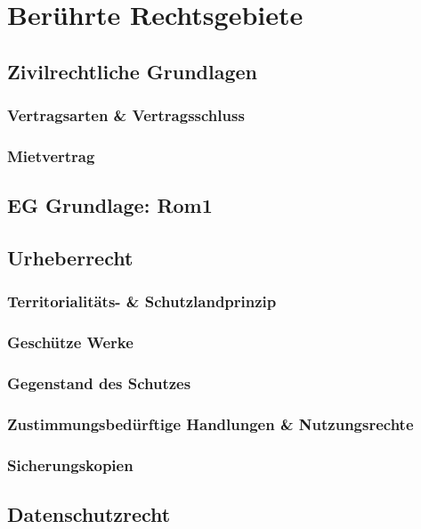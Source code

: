 \chapter{Ber\"uhrte Rechtsgebiete}
\section{Zivilrechtliche Grundlagen}
\subsection{Vertragsarten \& Vertragsschluss}
   \label{vertragsarten_u_vertragsschluss}
\subsection{Mietvertrag}
  \label{mietvertrag}
\section{EG Grundlage: Rom1}
\section{Urheberrecht}
\subsection{Territorialit\"ats- \& Schutzlandprinzip}
   \label{territorialitaets_u_schutzlandprinzip}
\subsection{Gesch\"utze Werke}
   \label{geschuetzte_werke}
\subsection{Gegenstand des Schutzes}
  \label{gegenstand_des_schutzes}
\subsection{Zustimmungsbed\"urftige Handlungen \& Nutzungsrechte}
 \label{zustimmungsbeduerftige_handlungen_nutzungsrechte}
\subsection{Sicherungskopien}
 \label{sicherungskopien}
\section{Datenschutzrecht}
